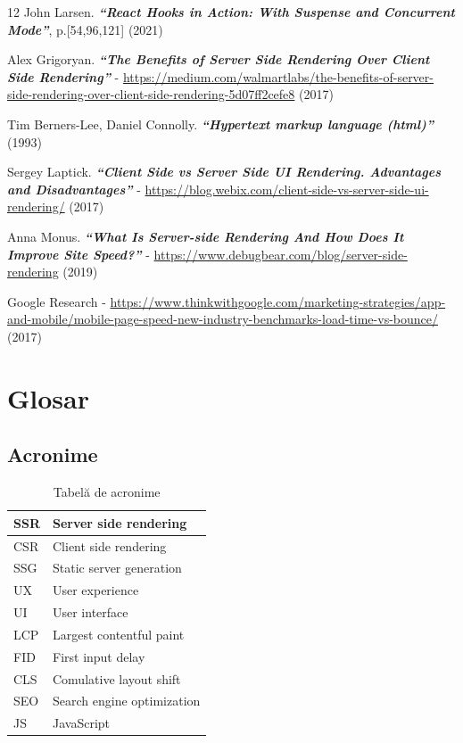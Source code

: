 \documentclass[12pt, a4paper]{report}
\begin{document}
\begin{thebibliography} {12}
	John Larsen. \textbf{\textit{“React Hooks in Action: With Suspense and Concurrent Mode”}}, p.[54,96,121] (2021)

	 Alex Grigoryan. \textbf{\textit{“The Benefits of Server Side Rendering Over Client Side Rendering”}} - \url{https://medium.com/walmartlabs/the-benefits-of-server-side-rendering-over-client-side-rendering-5d07ff2cefe8} (2017)

	 Tim Berners-Lee, Daniel Connolly. \textbf{\textit{“Hypertext markup language (html)”}} (1993)

	 Sergey Laptick. \textbf{\textit{“Client Side vs Server Side UI Rendering. Advantages and Disadvantages”}} -  \url{https://blog.webix.com/client-side-vs-server-side-ui-rendering/} (2017)

	 Anna Monus. \textbf{\textit{“What Is Server-side Rendering And How Does It Improve Site Speed?”}} -  \url{https://www.debugbear.com/blog/server-side-rendering} (2019)

	 Google Research - \url{https://www.thinkwithgoogle.com/marketing-strategies/app-and-mobile/mobile-page-speed-new-industry-benchmarks-load-time-vs-bounce/} (2017)


\end{thebibliography}


\appendix %

\chapter{Glosar}


\section{Acronime}

\begin{table} [H]
	\begin{tabular} {|  l | L{10cm} |}
		\hline
		SSR & Server side rendering      \\ [0.2ex]
		\hline
		CSR & Client side rendering      \\ [0.2ex]
		\hline
		SSG & Static server generation   \\ [0.2ex]
		\hline
		UX  & User experience            \\ [0.2ex]
		\hline
		UI  & User interface             \\ [0.2ex]
		\hline
		LCP & Largest contentful paint   \\ [0.2ex]
		\hline
		FID & First input delay          \\ [0.2ex]
		\hline
		CLS & Comulative layout shift    \\ [0.2ex]
		\hline
		SEO & Search engine optimization \\ [0.2ex]
		\hline
		JS  & JavaScript                 \\ [0.2ex]
		\hline
	\end{tabular}
	\caption{Tabel\u a de acronime}
	\label{table:acron}
\end{table}

\end{document}
